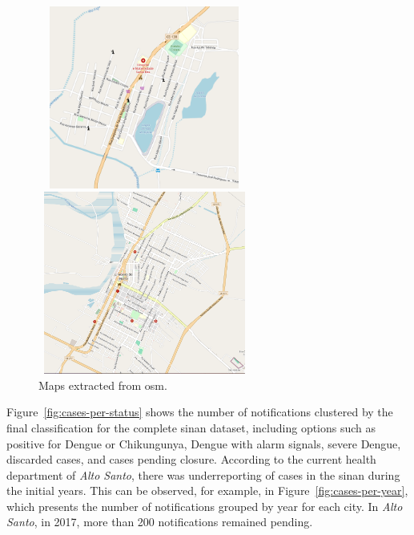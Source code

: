 \begin{figure}[ht!]
	\begin{minipage}[c]{.5\textwidth}
		\includegraphics[width=7cm, height=6cm]{images/alto-santo-osm.png}
	\end{minipage}
	\begin{minipage}[c]{.5\textwidth}
		\includegraphics[width=7cm, height=6cm]{images/limoeiro-mapa.png}
	\end{minipage}
	\caption{\label{fig:osm-graph-examples} Maps extracted from \gls{osm}.}
\end{figure}

Figure~\ref{fig:cases-per-status} shows the number of notifications clustered by
the final classification for the complete \gls{sinan} dataset, including options
such as positive for Dengue or Chikungunya, Dengue with alarm signals, severe
Dengue, discarded cases, and cases pending closure. According to the current
health department of \textit{Alto Santo}, there was underreporting of cases in
the \gls{sinan} during the initial years. This can be observed, for example, in
Figure~\ref{fig:cases-per-year}, which presents the number of notifications
grouped by year for each city. In \textit{Alto Santo}, in 2017, more than 200
notifications remained pending.


